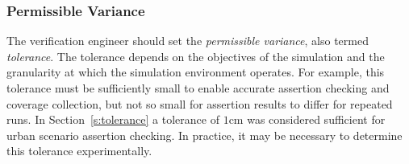 \documentclass[runningheads,twocolumn,a4paper,10pt]{llncs}
\begin{document}
\subsubsection{Permissible Variance} \label{s:threshold}
The verification engineer should set the \textit{permissible variance}, also termed \textit{tolerance}.
%
The tolerance depends on the objectives of the simulation and the granularity at which the simulation environment operates. For example, this tolerance must be sufficiently small to enable accurate assertion checking and coverage collection, but not so small for assertion results to differ for repeated runs. In Section~\ref{s:tolerance} a tolerance of $1$cm was considered sufficient for urban scenario assertion checking. In practice, it may be necessary to determine this tolerance experimentally. 

%





\end{document}
